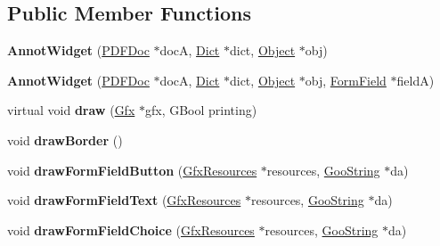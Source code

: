 \subsection*{Public Member Functions}
\begin{DoxyCompactItemize}
\item 
\mbox{\label{class_annot_widget_a094fc35419360369a2d53912424b1af3}} 
{\bfseries Annot\+Widget} (\hyperlink{class_p_d_f_doc}{P\+D\+F\+Doc} $\ast$docA, \hyperlink{class_dict}{Dict} $\ast$dict, \hyperlink{class_object}{Object} $\ast$obj)
\item 
\mbox{\label{class_annot_widget_ab26d267ac84eddf2f84de31a5b09777a}} 
{\bfseries Annot\+Widget} (\hyperlink{class_p_d_f_doc}{P\+D\+F\+Doc} $\ast$docA, \hyperlink{class_dict}{Dict} $\ast$dict, \hyperlink{class_object}{Object} $\ast$obj, \hyperlink{class_form_field}{Form\+Field} $\ast$fieldA)
\item 
\mbox{\label{class_annot_widget_a1f701f939cc355b7401c7fc89bceef66}} 
virtual void {\bfseries draw} (\hyperlink{class_gfx}{Gfx} $\ast$gfx, G\+Bool printing)
\item 
\mbox{\label{class_annot_widget_a8522aa760813fbac1cadfe8fd58e97af}} 
void {\bfseries draw\+Border} ()
\item 
\mbox{\label{class_annot_widget_a60711e2da1c82af1285acf75c7440ebc}} 
void {\bfseries draw\+Form\+Field\+Button} (\hyperlink{class_gfx_resources}{Gfx\+Resources} $\ast$resources, \hyperlink{class_goo_string}{Goo\+String} $\ast$da)
\item 
\mbox{\label{class_annot_widget_a99acf93d875d4f7e209d0fa928f98865}} 
void {\bfseries draw\+Form\+Field\+Text} (\hyperlink{class_gfx_resources}{Gfx\+Resources} $\ast$resources, \hyperlink{class_goo_string}{Goo\+String} $\ast$da)
\item 
\mbox{\label{class_annot_widget_a991364d9ebf9176025daf65fdd15fdd3}} 
void {\bfseries draw\+Form\+Field\+Choice} (\hyperlink{class_gfx_resources}{Gfx\+Resources} $\ast$resources, \hyperlink{class_goo_string}{Goo\+String} $\ast$da)
\item 
\mbox{\label{class_annot_widget_aa20adfcb21455c7640a5bee2ff2d97bc}} 

\end{DoxyCompactItemize}
